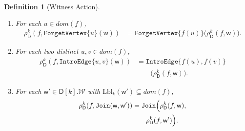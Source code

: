 \documentclass[11pt,a4paper]{article}
\newtheorem{definition}[theorem]{Definition}
\newcommand{\treewidthvalue}{k}
\newcommand{\forgetvertextype}[1]{\mathtt{ForgetVertex}\{#1\}}
\newcommand{\jointype}{\mathtt{Join}}
\newcommand{\introedgegeneric}[2]{\mathtt{IntroEdge}\{#1,#2\}}
\newcommand{\vertexone}{u}
\newcommand{\vertextwo}{v}
\newcommand{\allwitnesses}{\mathcal{W}}
\newcommand{\awitness}{\mathsf{w}}
\newcommand{\dpcore}{\mathsf{D}}
\newcommand{\domain}{dom}
\newcommand{\relabelingfunction}{f}
\newcommand{\action}{\rho}
\begin{document}
\begin{definition}[Witness Action]
\begin{enumerate}
\begin{enumerate}
		    \item \label{condition:relabeldpcore-condition-five}
				    For each $\vertexone\in \domain(\relabelingfunction)$,
				    \[
				    \begin{aligned}
				    \action_{\dpcore}^{\treewidthvalue}(\relabelingfunction,\forgetvertextype{\vertexone}(\awitness))
				    &=
				    \forgetvertextype{\relabelingfunction(\vertexone)}\bigl(\action_{\dpcore}^{\treewidthvalue}(\relabelingfunction,\awitness)\bigr).
				    \end{aligned}
				    \]
		    \item \label{condition:relabeldpcore-condition-six}
				    For each two distinct $\vertexone,\vertextwo\in \domain(\relabelingfunction)$,
				    \[
				    \begin{aligned}
				    \action_{\dpcore}^{\treewidthvalue}(\relabelingfunction,\introedgegeneric{\vertexone}{\vertextwo}(\awitness))
				    &=
				    \introedgegeneric{\relabelingfunction(\vertexone)}{\relabelingfunction(\vertextwo)}\\
				    &\qquad\bigl(\action_{\dpcore}^{\treewidthvalue}(\relabelingfunction,\awitness)\bigr).
				    \end{aligned}
				    \]
	    \item \label{condition:relabeldpcore-condition-seven}
				    For each $\awitness'\in  \dpcore[\treewidthvalue].\allwitnesses$ with $\mathrm{Lbl}_{\treewidthvalue}(\awitness')\subseteq \domain(\relabelingfunction)$,
				    \[
				    \begin{aligned}
				    \action_{\dpcore}^{\treewidthvalue}(\relabelingfunction,\jointype(\awitness,\awitness'))
				    &=
				    \jointype\Bigl(\action_{\dpcore}^{\treewidthvalue}(\relabelingfunction,\awitness),\\
				    &\qquad\action_{\dpcore}^{\treewidthvalue}(\relabelingfunction,\awitness')\Bigr).
				    \end{aligned}
				    \]
			    \end{enumerate}
\end{enumerate}
\end{definition}
\end{document}
